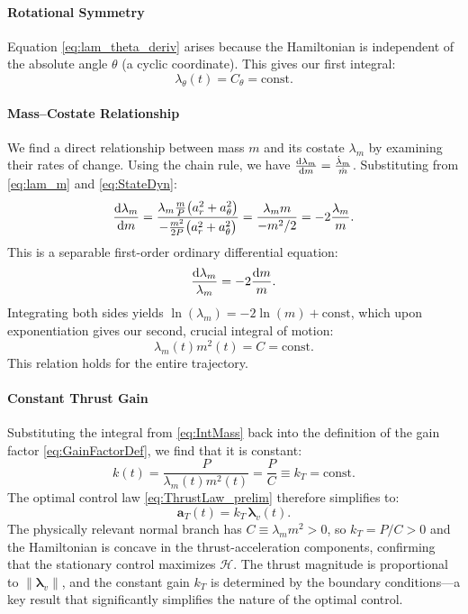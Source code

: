 \documentclass[journal,a4paper]{IEEEtran}
\begin{document}
\paragraph{Rotational Symmetry}
Equation \eqref{eq:lam_theta_deriv} arises because the Hamiltonian is independent of the absolute angle $\theta$ (a cyclic coordinate). This gives our first integral:
\begin{equation}
  \boxed{\lambda_\theta(t) = C_\theta = \text{const}}.
\end{equation}

\paragraph{Mass--Costate Relationship}
We find a direct relationship between mass $m$ and its costate $\lambda_m$ by examining their rates of change. Using the chain rule, we have $\frac{{\rm d}\lambda_m}{{\rm d}m} = \frac{\dot\lambda_m}{\dot m}$. Substituting from \eqref{eq:lam_m} and \eqref{eq:StateDyn}:
\begin{equation}
    \frac{{\rm d}\lambda_m}{{\rm d}m} = \frac{\lambda_m \frac{m}{P}\bigl(a_r^{2}+a_\theta^{2}\bigr)}{-\frac{m^{2}}{2P}\bigl(a_r^{2}+a_\theta^{2}\bigr)} = \frac{\lambda_m m}{-m^2/2} = -2\frac{\lambda_m}{m}. \nonumber
\end{equation}
This is a separable first-order ordinary differential equation:
\[
    \frac{{\rm d}\lambda_m}{\lambda_m} = -2\frac{{\rm d}m}{m}.
\]
Integrating both sides yields $\ln(\lambda_m) = -2\ln(m) + \text{const}$, which upon exponentiation gives our second, crucial integral of motion:
\begin{equation}
  \boxed{\lambda_m(t) m^2(t) = C = \text{const}}.
  \label{eq:IntMass}
\end{equation}
This relation holds for the entire trajectory.

\paragraph{Constant Thrust Gain}
Substituting the integral from \eqref{eq:IntMass} back into the definition of the gain factor \eqref{eq:GainFactorDef}, we find that it is constant:
\begin{equation}
  k(t) = \frac{P}{\lambda_m(t) m^2(t)} = \frac{P}{C} \equiv k_T = \text{const}.
\end{equation}
The optimal control law \eqref{eq:ThrustLaw_prelim} therefore simplifies to:
\begin{equation}
  \mathbf{a}_T(t) = k_T\,\boldsymbol{\lambda}_v(t).
  \label{eq:ThrustLaw_Final}
\end{equation}
The physically relevant normal branch has \(C\equiv\lambda_m m^2>0\), so \(k_T=P/C>0\) and the Hamiltonian is concave in the thrust-acceleration components, confirming that the stationary control maximizes \(\mathcal{H}\). The thrust magnitude is proportional to \(\|\boldsymbol{\lambda}_v\|\), and the constant gain \(k_T\) is determined by the boundary conditions---a key result that significantly simplifies the nature of the optimal control.
\end{document}
